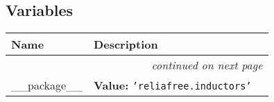 
  \subsection{Variables}

    \vspace{-1cm}
\hspace{\varindent}\begin{longtable}{|p{\varnamewidth}|p{\vardescrwidth}|l}
\cline{1-2}
\cline{1-2} \centering \textbf{Name} & \centering \textbf{Description}& \\
\cline{1-2}
\endhead\cline{1-2}\multicolumn{3}{r}{\small\textit{continued on next page}}\\\endfoot\cline{1-2}
\endlastfoot\raggedright \_\-\_\-p\-a\-c\-k\-a\-g\-e\-\_\-\_\- & \raggedright \textbf{Value:} 
{\tt \texttt{'}\texttt{reliafree.inductors}\texttt{'}}&\\
\cline{1-2}
\end{longtable}

